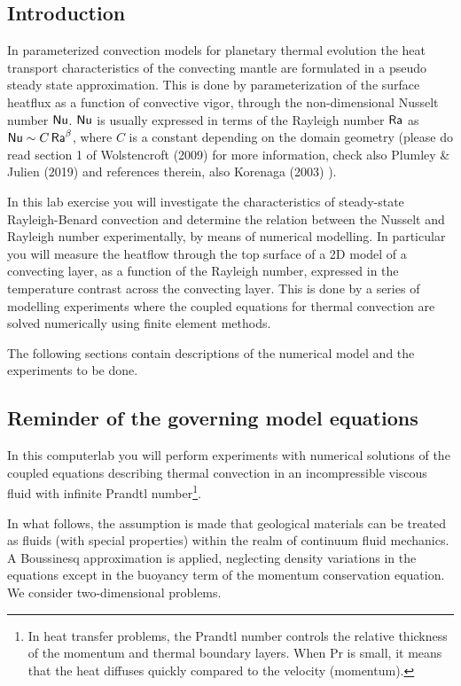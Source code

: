 
\subsection{Introduction}

In parameterized convection models for planetary thermal evolution the heat transport characteristics 
of the convecting mantle are formulated in a pseudo steady state approximation. 
This is done by parameterization of the surface heatflux as a function of convective vigor, 
through the non-dimensional Nusselt number ${\mathsf{Nu}}$. 
${\mathsf{Nu}}$ is usually expressed in terms of the 
Rayleigh number ${\mathsf{Ra}}$ as ${\mathsf{Nu}} \sim C\, {\mathsf{Ra}}^\beta$, where $C$ is a 
constant depending on the domain geometry
(please do read section 1 of Wolstencroft \etal (2009) \cite{wodd09} 
for more information, check also Plumley \& Julien (2019) \cite{plju19} and references therein, 
also Korenaga (2003) \cite{kore03}).

In this lab exercise you will investigate the characteristics of steady-state Rayleigh-Benard convection 
and determine the relation between the Nusselt and Rayleigh number experimentally, 
by means of numerical modelling. In particular you will measure the heatflow through the top surface of 
a 2D model of a convecting layer, as a function of the Rayleigh number, expressed in the temperature 
contrast across the convecting layer. 
This is done by a series of modelling experiments where the coupled equations for thermal convection are solved 
numerically using finite element methods.

The following sections contain descriptions of the numerical model and the experiments to be done. 

\subsection{Reminder of the governing model equations}

In this computerlab you will perform experiments with numerical solutions of the 
coupled equations describing thermal convection in an 
incompressible viscous fluid with infinite Prandtl number\footnote{In heat transfer problems, 
the Prandtl number controls the relative thickness of 
the momentum and thermal boundary layers. When Pr is small, it means that the heat diffuses 
quickly compared to the velocity (momentum).}.

In what follows, the assumption is made that geological materials can be treated as fluids (with 
special properties) within the realm of continuum fluid mechanics.
A Boussinesq approximation is applied, neglecting density variations in the equations except 
in the buoyancy term of the momentum conservation equation. We consider two-dimensional problems.

